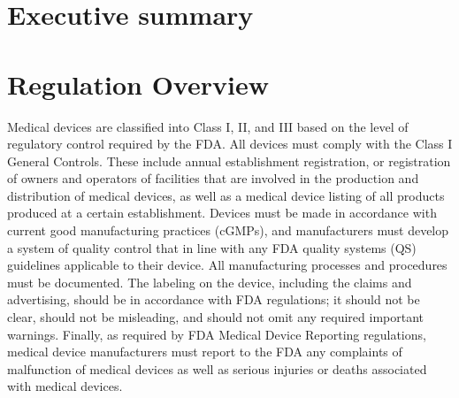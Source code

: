 \documentclass{article}
\begin{document}

\setcounter{tocdepth}{3}
\tableofcontents
\newpage

\section*{Executive summary}
\label{sec:exec-summary}

\section{Regulation Overview}
\label{sec:test-administration}

Medical devices are classified into Class I, II, and III based on the level of regulatory control required by the FDA. All devices must comply with the Class I General Controls. These include annual establishment registration, or registration of owners and operators of facilities that are involved in the production and distribution of medical devices, as well as a medical device listing of all products produced at a certain establishment. Devices must be made in accordance with current good manufacturing practices (cGMPs), and manufacturers must develop a system of quality control that in line with any FDA quality systems (QS) guidelines applicable to their device. All manufacturing processes and procedures must be documented. The labeling on the device, including the claims and advertising, should be in accordance with FDA regulations; it should not be clear, should not be misleading, and should not omit any required important warnings. Finally, as required by FDA Medical Device Reporting regulations, medical device manufacturers must report to the FDA any complaints of malfunction of medical devices as well as serious injuries or deaths associated with medical devices. 
\end{document}
